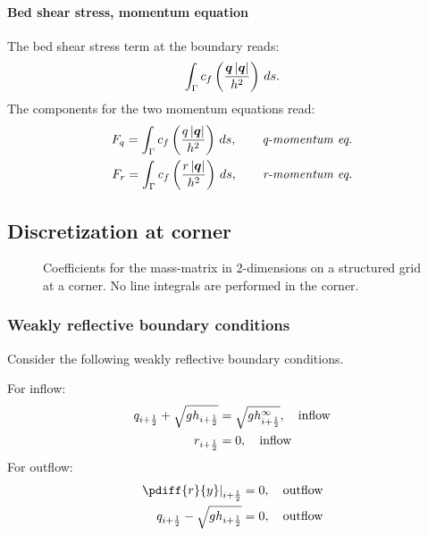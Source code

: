 \paragraph*{Bed shear stress, momentum equation}
The bed shear stress  term at the boundary  reads:
\begin{align}
    \int_\Gamma c_f \left( \frac{\bm{q}\left\lvert \bm{q} \right\rvert}{h^2} \right)\, ds.
\end{align}
The components for the two momentum equations read:
\begin{align}
    F_q = \int_\Gamma c_f \left( \frac{q\left\lvert \bm{q} \right\rvert}{h^2} \right)\, ds, \qquad \textit{q-momentum eq.}
    \\
    F_r = \int_\Gamma c_f \left( \frac{r\left\lvert \bm{q} \right\rvert}{h^2} \right)\, ds, \qquad \textit{r-momentum eq.}
\end{align}
\notyet
\subsection{Discretization at corner}
\begin{figure}[H]
    \begin{center}
        \def\svgwidth{0.8\textwidth} %
        \resizebox{0.65\textwidth}{!}{
            
        }
    \end{center}
    \caption{Coefficients for the mass-matrix in 2-dimensions on a structured grid at a corner. No line integrals are performed in the corner.}
    \label{fig:structured_grid_at_corner}
\end{figure}
\subsubsection{Weakly reflective boundary conditions}
Consider the following weakly reflective boundary conditions.

For inflow:
\begin{align}
    q_{i+\frac{1}{2}} + \sqrt{gh_{i+\frac{1}{2}}} &= \sqrt{gh^\infty_{i+\frac{1}{2}}}, \quad \text{inflow}
    \\
    r_{i+\frac{1}{2}} &= 0, \quad \text{inflow}
\end{align}
For outflow:
\begin{align}
    \left.\pdiff{r}{y}\right|_{i+\half} &= 0, \quad \text{outflow}
    \\
    q_{i+\half} - \sqrt{gh_{i+\half}} & = 0, \quad \text{outflow}
\end{align}